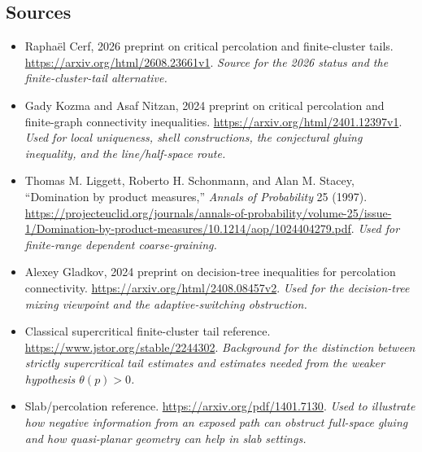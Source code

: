 \documentclass[11pt]{article}
\begin{document}
\subsection{Sources}
\begin{itemize}
\item[S1] Rapha\"el Cerf, 2026 preprint on critical percolation and finite-cluster tails.
\url{https://arxiv.org/html/2608.23661v1}.
\textit{Source for the 2026 status and the finite-cluster-tail alternative.}

\item[S2] Gady Kozma and Asaf Nitzan, 2024 preprint on critical percolation and finite-graph connectivity inequalities.
\url{https://arxiv.org/html/2401.12397v1}.
\textit{Used for local uniqueness, shell constructions, the conjectural gluing inequality, and the line/half-space route.}

\item[S3] Thomas M. Liggett, Roberto H. Schonmann, and Alan M. Stacey, ``Domination by product measures,'' \emph{Annals of Probability} 25 (1997).
\url{https://projecteuclid.org/journals/annals-of-probability/volume-25/issue-1/Domination-by-product-measures/10.1214/aop/1024404279.pdf}.
\textit{Used for finite-range dependent coarse-graining.}

\item[S4] Alexey Gladkov, 2024 preprint on decision-tree inequalities for percolation connectivity.
\url{https://arxiv.org/html/2408.08457v2}.
\textit{Used for the decision-tree mixing viewpoint and the adaptive-switching obstruction.}

\item[S5] Classical supercritical finite-cluster tail reference.
\url{https://www.jstor.org/stable/2244302}.
\textit{Background for the distinction between strictly supercritical tail estimates and estimates needed from the weaker hypothesis \(\theta(p)>0\).}

\item[S6] Slab/percolation reference.
\url{https://arxiv.org/pdf/1401.7130}.
\textit{Used to illustrate how negative information from an exposed path can obstruct full-space gluing and how quasi-planar geometry can help in slab settings.}
\end{itemize}
\end{document}
